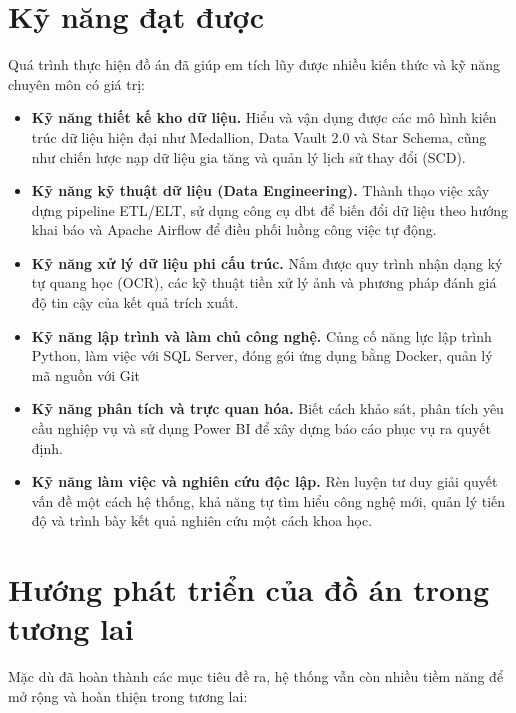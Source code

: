 \documentclass[oneside, a4paper]{book}
\theoremstyle{plain}
\theoremstyle{definition}
\theoremstyle{remark}
\begin{document}
\section*{Kỹ năng đạt được}

Quá trình thực hiện đồ án đã giúp em tích lũy được nhiều kiến thức và kỹ năng chuyên môn có giá trị:

\begin{itemize}
    \item \textbf{Kỹ năng thiết kế kho dữ liệu.} Hiểu và vận dụng được các mô hình kiến trúc dữ liệu hiện đại như Medallion, Data Vault 2.0 và Star Schema, cũng như chiến lược nạp dữ liệu gia tăng và quản lý lịch sử thay đổi (SCD).

    \item \textbf{Kỹ năng kỹ thuật dữ liệu (Data Engineering).} Thành thạo việc xây dựng pipeline ETL/ELT, sử dụng công cụ dbt để biến đổi dữ liệu theo hướng khai báo và Apache Airflow để điều phối luồng công việc tự động.

    \item \textbf{Kỹ năng xử lý dữ liệu phi cấu trúc.} Nắm được quy trình nhận dạng ký tự quang học (OCR), các kỹ thuật tiền xử lý ảnh và phương pháp đánh giá độ tin cậy của kết quả trích xuất.

    \item \textbf{Kỹ năng lập trình và làm chủ công nghệ.} Củng cố năng lực lập trình Python, làm việc với SQL Server, đóng gói ứng dụng bằng Docker, quản lý mã nguồn với Git

    \item \textbf{Kỹ năng phân tích và trực quan hóa.} Biết cách khảo sát, phân tích yêu cầu nghiệp vụ và sử dụng Power BI để xây dựng báo cáo phục vụ ra quyết định.

    \item \textbf{Kỹ năng làm việc và nghiên cứu độc lập.} Rèn luyện tư duy giải quyết vấn đề một cách hệ thống, khả năng tự tìm hiểu công nghệ mới, quản lý tiến độ và trình bày kết quả nghiên cứu một cách khoa học.
\end{itemize}

\section*{Hướng phát triển của đồ án trong tương lai}

Mặc dù đã hoàn thành các mục tiêu đề ra, hệ thống vẫn còn nhiều tiềm năng để mở rộng và hoàn thiện trong tương lai:
\end{document}
